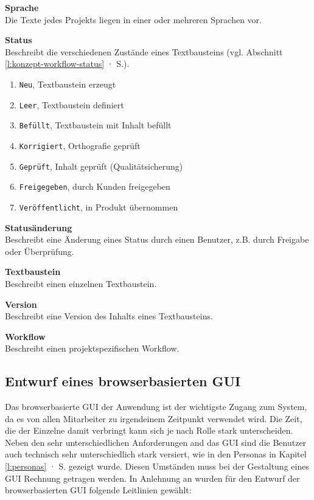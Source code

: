\textsf{\textbf{Sprache}}\\Die Texte jedes Projekts liegen in einer oder mehreren Sprachen vor.

\textsf{\textbf{Status}}\\Beschreibt die verschiedenen Zustände eines Textbausteins (vgl. Abschnitt \ref{l:konzept-workflow-status} · S.\pageref{l:konzept-workflow-status}).

\begin{enumerate}\itemsep -5pt
\item \texttt{Neu}, Textbaustein erzeugt
\item \texttt{Leer}, Textbaustein definiert
\item \texttt{Befüllt}, Textbaustein mit Inhalt befüllt
\item \texttt{Korrigiert}, Orthografie geprüft
\item \texttt{Geprüft}, Inhalt geprüft (Qualitätsicherung)
\item \texttt{Freigegeben}, durch Kunden freigegeben
\item \texttt{Veröffentlicht}, in Produkt übernommen
\end{enumerate}

\textsf{\textbf{Statusänderung}}\\Beschreibt eine Änderung eines Status durch einen Benutzer, z.B. durch Freigabe oder Überprüfung.

\textsf{\textbf{Textbaustein}}\\Beschreibt einen einzelnen Textbaustein.

\textsf{\textbf{Version}}\\Beschreibt eine Version des Inhalts eines Textbausteins.

\textsf{\textbf{Workflow}}\\Beschreibt einen projektspezifischen Workflow.

\pagebreak

\subsection{Entwurf eines browserbasierten GUI}\label{l:entwurf-gui}

Das browserbasierte GUI der Anwendung ist der wichtigste Zugang zum System, da es von allen Mitarbeiter zu irgendeinem Zeitpunkt verwendet wird. Die Zeit, die der Einzelne damit verbringt kann sich je nach Rolle stark unterscheiden. Neben den sehr unterschiedlichen Anforderungen and das GUI sind die Benutzer auch technisch sehr unterschiedlich stark versiert, wie in den Personas in Kapitel \ref{l:personas} · S.\pageref{l:personas} gezeigt wurde. Diesen Umständen muss bei der Gestaltung eines GUI Rechnung getragen werden. In Anlehnung an \cite{nielsen} wurden für den Entwurf der browserbasierten GUI folgende Leitlinien gewählt:


